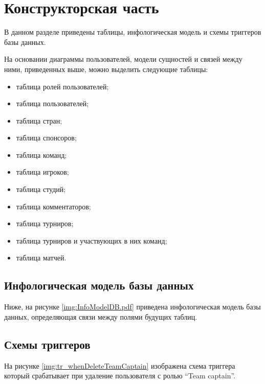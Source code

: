 \chapter{Конструкторская часть}
\label{cha:design}

В данном разделе приведены таблицы, инфологическая модель и схемы триггеров базы данных.


На основании диаграммы пользователей, модели сущностей и связей между ними, приведенных выше, можно выделить следующие таблицы:

\begin{itemize}
	\item таблица ролей пользователей;
	\item таблица пользователей;
	\item таблица стран;
	\item таблица спонсоров;
	\item таблица команд;
	\item таблица игроков;
	\item таблица студий;
	\item таблица комментаторов;
	\item таблица турниров;
	\item таблица турниров и участвующих в них команд;
	\item таблица матчей.
\end{itemize}

\newpage
\section{Инфологическая модель базы данных}
Ниже, на рисунке \ref{img:InfoModelDB.pdf} приведена инфологическая модель базы данных, определяющая связи между полями будущих таблиц.


\newpage
\section{Схемы триггеров}
На рисунке \ref{img:tr_whenDeleteTeamCaptain} изображена схема триггера который срабатывает при удаление пользователя с ролью \textquotedblleft Team captain\textquotedblright.

